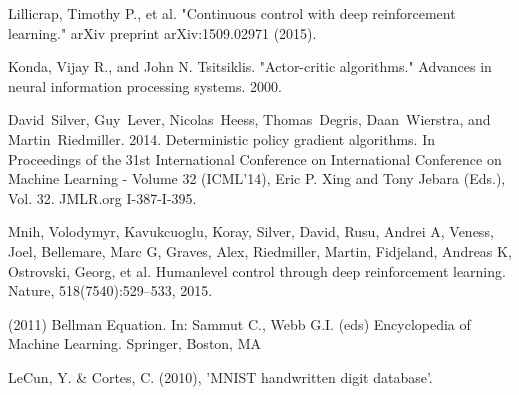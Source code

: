 \documentclass[peerreview]{IEEEtran}
\begin{document}
\begin{thebibliography}{1}

  Lillicrap, Timothy P., et al. "Continuous control with deep reinforcement learning." arXiv preprint arXiv:1509.02971 (2015).
  
  Konda, Vijay R., and John N. Tsitsiklis. "Actor-critic algorithms." Advances in neural information processing systems. 2000.
  
  David~Silver, Guy~Lever, Nicolas~Heess, Thomas~Degris, Daan~Wierstra, and Martin~Riedmiller. 2014. Deterministic policy gradient algorithms. In Proceedings of the 31st International Conference on International Conference on Machine Learning - Volume 32 (ICML'14), Eric P. Xing and Tony Jebara (Eds.), Vol. 32. JMLR.org I-387-I-395.
  
  
  Mnih, Volodymyr, Kavukcuoglu, Koray, Silver, David, Rusu, Andrei A, Veness, Joel, Bellemare,
Marc G, Graves, Alex, Riedmiller, Martin, Fidjeland, Andreas K, Ostrovski, Georg, et al. Humanlevel control through deep reinforcement learning. Nature, 518(7540):529–533, 2015.


(2011) Bellman Equation. In: Sammut C., Webb G.I. (eds) Encyclopedia of Machine Learning. Springer, Boston, MA


	LeCun, Y. \& Cortes, C. (2010), 'MNIST handwritten digit database'.
 
\end{thebibliography}

\end{document}
